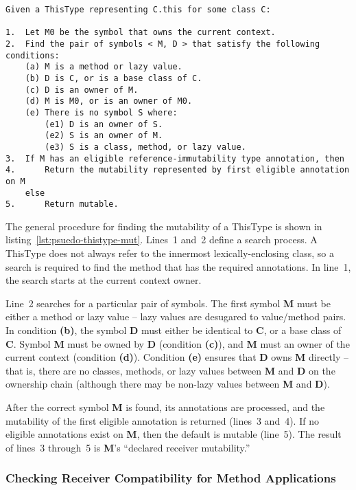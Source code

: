 \documentclass[11pt]{report}
\newcommand{\cdf}{\bf\ttfamily} %
\newcommand{\cde}{\cdf\footnotesize}  %
\newcommand{\cd}{\cdf\small}  %
\begin{document}
\begin{lstlisting}[float=htbp, caption={Psuedocode for Finding ThisType Mutability}, language={PsuedoCode}, emphstyle={\cde\color{Black}}, label={lst:psuedo-thistype-mut}]
Given a ThisType representing C.this for some class C:

1.  Let M0 be the symbol that owns the current context.
2.  Find the pair of symbols < M, D > that satisfy the following conditions:
    (a) M is a method or lazy value.
    (b) D is C, or is a base class of C.
    (c) D is an owner of M.
    (d) M is M0, or is an owner of M0.
    (e) There is no symbol S where:
        (e1) D is an owner of S.
        (e2) S is an owner of M.
        (e3) S is a class, method, or lazy value.
3.  If M has an eligible reference-immutability type annotation, then
4.      Return the mutability represented by first eligible annotation on M
    else
5.      Return mutable.
\end{lstlisting}

The general procedure for finding the mutability of a ThisType is shown in listing~\ref{lst:psuedo-thistype-mut}. Lines~1 and~2 define a search process.
A ThisType does not always refer to the innermost lexically-enclosing class, so a search is required to find the method that has the required annotations.
In line~1, the search starts at the current context owner.

Line~2 searches for a particular pair of symbols. The first symbol {\cd M} must be either a method or lazy value -- lazy values are desugared to value/method pairs. In condition {\cd (b)}, the symbol {\cd D} must either be identical to {\cd C}, or a base class of {\cd C}. Symbol {\cd M} must be owned by {\cd D} (condition {\cd (c)}), and {\cd M} must an owner of the current context (condition {\cd (d)}). Condition {\cd (e)} ensures that {\cd D} owns {\cd M} directly -- that is, there are no classes, methods, or lazy values between {\cd M} and {\cd D} on the ownership chain (although there may be non-lazy values between {\cd M} and {\cd D}).

After the correct symbol {\cd M} is found, its annotations are processed, and the mutability of the first eligible annotation is returned (lines~3 and~4).
If no eligible annotations exist on {\cd M}, then the default is mutable (line~5).
The result of lines~3 through~5 is {\cd M}'s ``declared receiver mutability.''

\subsubsection{Checking Receiver Compatibility for Method Applications}
\end{document}
